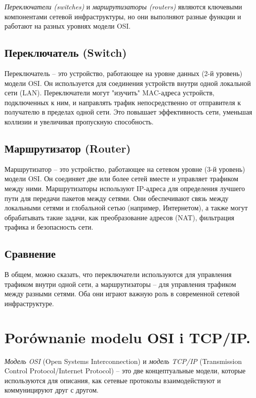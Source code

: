 \textit{Переключатели (switches)} и \textit{маршрутизаторы (routers)} являются ключевыми компонентами сетевой инфраструктуры, но они выполняют разные функции и работают на разных уровнях модели OSI.

\subsection{Переключатель (Switch)}

Переключатель – это устройство, работающее на уровне данных (2-й уровень) модели OSI. Он используется для соединения устройств внутри одной локальной сети (LAN). Переключатели могут "изучить" MAC-адреса устройств, подключенных к ним, и направлять трафик непосредственно от отправителя к получателю в пределах одной сети. Это повышает эффективность сети, уменьшая коллизии и увеличивая пропускную способность.

\subsection{Маршрутизатор (Router)}

Маршрутизатор – это устройство, работающее на сетевом уровне (3-й уровень) модели OSI. Он соединяет две или более сетей вместе и управляет трафиком между ними. Маршрутизаторы используют IP-адреса для определения лучшего пути для передачи пакетов между сетями. Они обеспечивают связь между локальными сетями и глобальной сетью (например, Интернетом), а также могут обрабатывать такие задачи, как преобразование адресов (NAT), фильтрация трафика и безопасность сети.

\subsection{Сравнение}

В общем, можно сказать, что переключатели используются для управления трафиком внутри одной сети, а маршрутизаторы – для управления трафиком между разными сетями. Оба они играют важную роль в современной сетевой инфраструктуре.


\section{Porównanie modelu OSI i TCP/IP.}

\textit{Модель OSI} (Open Systems Interconnection) и \textit{модель TCP/IP} (Transmission Control Protocol/Internet Protocol) – это две концептуальные модели, которые используются для описания, как сетевые протоколы взаимодействуют и коммуницируют друг с другом. 

